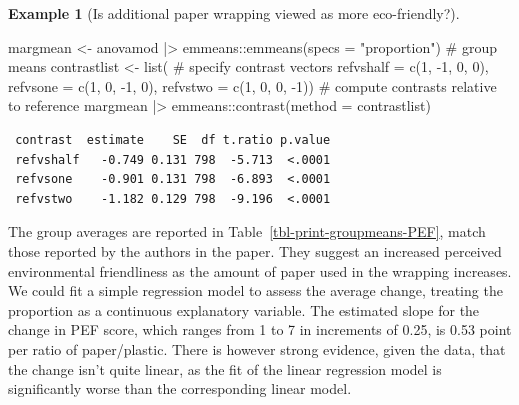 \documentclass[
  11pt,
  letterpaper,
]{scrbook}
\newenvironment{Shaded}{\begin{snugshade}}{\end{snugshade}}
\newcommand{\AttributeTok}[1]{\textcolor[rgb]{0.40,0.45,0.13}{#1}}
\newcommand{\CommentTok}[1]{\textcolor[rgb]{0.37,0.37,0.37}{#1}}
\newcommand{\DecValTok}[1]{\textcolor[rgb]{0.68,0.00,0.00}{#1}}
\newcommand{\FunctionTok}[1]{\textcolor[rgb]{0.28,0.35,0.67}{#1}}
\newcommand{\NormalTok}[1]{\textcolor[rgb]{0.00,0.23,0.31}{#1}}
\newcommand{\OtherTok}[1]{\textcolor[rgb]{0.00,0.23,0.31}{#1}}
\newcommand{\SpecialCharTok}[1]{\textcolor[rgb]{0.37,0.37,0.37}{#1}}
\newcommand{\StringTok}[1]{\textcolor[rgb]{0.13,0.47,0.30}{#1}}
\theoremstyle{definition}
\newtheorem{example}{Example}[chapter]
\theoremstyle{definition}
\theoremstyle{remark}
\begin{document}
\begin{example}[Is additional paper wrapping viewed as more
eco-friendly?]
\begin{Shaded}
\begin{Highlighting}[]
\NormalTok{margmean }\OtherTok{\textless{}{-}}\NormalTok{ anovamod }\SpecialCharTok{|\textgreater{}}  
\NormalTok{  emmeans}\SpecialCharTok{::}\FunctionTok{emmeans}\NormalTok{(}\AttributeTok{specs =} \StringTok{"proportion"}\NormalTok{) }\CommentTok{\# group means}
\NormalTok{contrastlist }\OtherTok{\textless{}{-}} \FunctionTok{list}\NormalTok{( }\CommentTok{\# specify contrast vectors}
   \AttributeTok{refvshalf =} \FunctionTok{c}\NormalTok{(}\DecValTok{1}\NormalTok{, }\SpecialCharTok{{-}}\DecValTok{1}\NormalTok{, }\DecValTok{0}\NormalTok{, }\DecValTok{0}\NormalTok{),}
   \AttributeTok{refvsone =}  \FunctionTok{c}\NormalTok{(}\DecValTok{1}\NormalTok{, }\DecValTok{0}\NormalTok{, }\SpecialCharTok{{-}}\DecValTok{1}\NormalTok{, }\DecValTok{0}\NormalTok{),}
   \AttributeTok{refvstwo =}  \FunctionTok{c}\NormalTok{(}\DecValTok{1}\NormalTok{, }\DecValTok{0}\NormalTok{, }\DecValTok{0}\NormalTok{, }\SpecialCharTok{{-}}\DecValTok{1}\NormalTok{))}
\CommentTok{\# compute contrasts relative to reference}
\NormalTok{margmean }\SpecialCharTok{|\textgreater{}}\NormalTok{ emmeans}\SpecialCharTok{::}\FunctionTok{contrast}\NormalTok{(}\AttributeTok{method =}\NormalTok{ contrastlist)}
\end{Highlighting}
\end{Shaded}

\begin{verbatim}
 contrast  estimate    SE  df t.ratio p.value
 refvshalf   -0.749 0.131 798  -5.713  <.0001
 refvsone    -0.901 0.131 798  -6.893  <.0001
 refvstwo    -1.182 0.129 798  -9.196  <.0001
\end{verbatim}

The group averages are reported in Table~\ref{tbl-print-groupmeans-PEF},
match those reported by the authors in the paper. They suggest an
increased perceived environmental friendliness as the amount of paper
used in the wrapping increases. We could fit a simple regression model
to assess the average change, treating the proportion as a continuous
explanatory variable. The estimated slope for the change in PEF score,
which ranges from 1 to 7 in increments of 0.25, is 0.53 point per ratio
of paper/plastic. There is however strong evidence, given the data, that
the change isn't quite linear, as the fit of the linear regression model
is significantly worse than the corresponding linear model.

\begin{longtable}[t]{rrrrrr}


\end{longtable}
\end{example}
\end{document}
